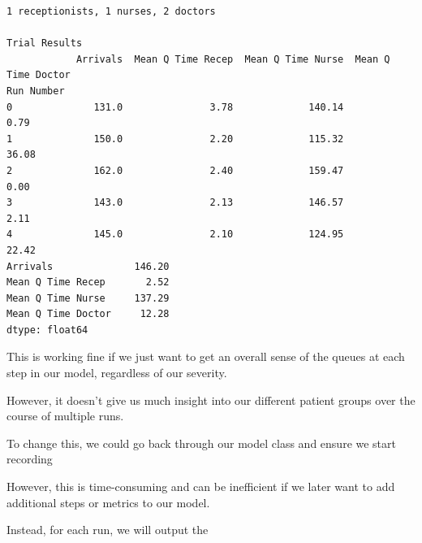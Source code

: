 \documentclass[
  letterpaper,
  DIV=11,
  numbers=noendperiod]{scrreprt}
\begin{document}
\begin{verbatim}
1 receptionists, 1 nurses, 2 doctors

Trial Results
            Arrivals  Mean Q Time Recep  Mean Q Time Nurse  Mean Q Time Doctor
Run Number                                                                    
0              131.0               3.78             140.14                0.79
1              150.0               2.20             115.32               36.08
2              162.0               2.40             159.47                0.00
3              143.0               2.13             146.57                2.11
4              145.0               2.10             124.95               22.42
Arrivals              146.20
Mean Q Time Recep       2.52
Mean Q Time Nurse     137.29
Mean Q Time Doctor     12.28
dtype: float64
\end{verbatim}

This is working fine if we just want to get an overall sense of the
queues at each step in our model, regardless of our severity.

However, it doesn't give us much insight into our different patient
groups over the course of multiple runs.

To change this, we could go back through our model class and ensure we
start recording

However, this is time-consuming and can be inefficient if we later want
to add additional steps or metrics to our model.

Instead, for each run, we will output the
\end{document}

